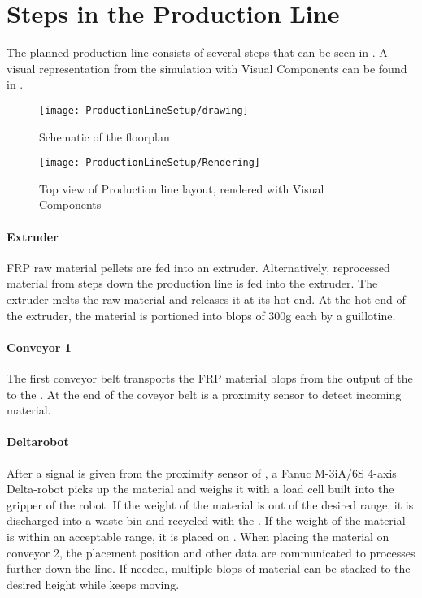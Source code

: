 \section{Steps in the Production Line}
The planned production line consists of several steps that can be seen in . A visual representation from the simulation with Visual Components can be found in .

\begin{figure}[H]
	\texttt{[image: ProductionLineSetup/drawing]}
	\caption{Schematic of the floorplan \cite{AliyaThesis}}
	\label{fig:ProdLineSchem}
\end{figure}

\begin{figure}[h]
	\texttt{[image: ProductionLineSetup/Rendering]}
	\caption{Top view of Production line layout, rendered with Visual Components \cite{AliyaThesis}}
	\label{fig:ProdLineVisComp}
\end{figure}



\paragraph{Extruder} \label{sec:extruder}
\ac{FRP} raw material pellets are fed into an extruder. 
Alternatively, reprocessed material from steps down the production line is fed into the extruder.
The extruder melts the raw material and releases it at its hot end. 
At the hot end of the extruder, the material is portioned into blops of 300g each by a guillotine.

\paragraph{Conveyor 1} \label{sec:conveyor1}
The first conveyor belt transports the \ac{FRP} material blops from the output of the  to the . At the end of the coveyor belt is a proximity sensor to detect incoming material.

\paragraph{Deltarobot} \label{sec:Deltarobot}
After a signal is given from the proximity sensor of , a  Fanuc M-3iA/6S 4-axis Delta-robot picks up the material and weighs it with a load cell built into the gripper of the robot. 
If the weight of the material is out of the desired range, it is discharged into a waste bin and recycled with the .
If the weight of the material is within an acceptable range, it is placed on .
When placing the material on conveyor 2, the placement position and other data are communicated to processes further down the line.
If needed, multiple blops of material can be stacked to the desired height while  keeps moving.


